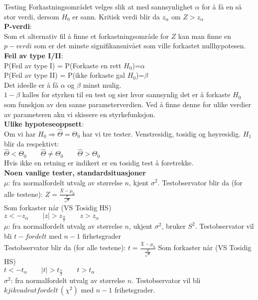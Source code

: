 \documentclass[final,hyperref={pdfpagelabels=false}]{beamer}
\begin{document}
\begin{frame}{}
\begin{columns}[t]
\begin{column}{.25\linewidth}
\begin{block}{\center\normalsize Testing}
{					Forkastningsområdet velges slik at med sannsynlighet $\alpha$ for å få en så stor verdi, dersom $H_0$ er sann. Kritisk verdi blir da $z_\alpha$ om $Z>z_\alpha$\\
					\textbf{P-verdi}:\\
					Som et alternativ fil å finne et forkastningsområde for $Z$ kan man finne en $p-verdi$ som er det minste signifikansnivået som ville forkastet nullhypotesen.\\
					\textbf{Feil av type I/II}:\\
					P(Feil av type I) = P(Forkaste en rett $H_0$)=$\alpha$\\
					P(Feil av type II) = P(ikke forkaste gal $H_0$)=$\beta$\\
					Det ideelle er å få $\alpha$ og $\beta$ minst mulig.\\
					$1-\beta$ kalles for styrken til en test og sier hvor sannsynlig det er å forkaste $H_0$ som funskjon av den sanne parameterverdien. Ved å finne denne for ulike verdier av parameteren akn vi skissere en styrkefunksjon.\\
					\textbf{Ulike hypoteseoppsett}:\\
					Om vi har $H_0\Rightarrow \hat\Theta=\Theta_0$ har vi tre tester. Venstresidig, tosidig og høyresidig. $H_1$ blir da respektivt:\\
					$\hat\Theta<\Theta_0\qquad\hat\Theta\neq\Theta_0\qquad\hat\Theta>\Theta_0$\\
					Hvis ikke en retning er indikert er en tosidig test å foretrekke.\\
					\textbf{Noen vanlige tester, standardsituasjoner}\\
					$\mu$: fra normalfordelt utvalg av størrelse $n$, kjent $\sigma^2$. Testobservator blir da (for alle testene): $Z=\frac{\bar X - \mu_0}{\frac{\sigma}{\sqrt n}}$\\
					Som forkaster når (VS Tosidig HS)\\
					$z<-z_\alpha\qquad |z|>z_\frac{\alpha}{2}\qquad z>z_\alpha$\\
					$\mu$: fra normalfordelt utvalg av størrelse $n$, ukjent $\sigma^2$, bruker $S^2$. Testobservator vil bli $t-fordelt$ med $n-1$ firhetsgrader\\
					Testobservator blir da (for alle testene): $t=\frac{\bar X-\mu_0}{\frac{S}{\sqrt n}}$
					Som forkaster når (VS Tosidig HS)\\
					$t<-t_\alpha\qquad |t|>t_\frac{\alpha}{2}\qquad t>t_\alpha$\\
					$\sigma^2$: fra normalfordelt utvalg av størrelse $n$. Testobservator vil bli $kjikvadratfordelt\,(\chi^2)$ med $n-1$ frihetsgrader.\\
}
\end{block}
\end{column}
\end{columns}
\end{frame}
\end{document}
